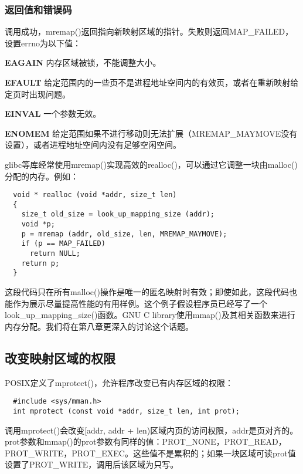 \subsubsection{返回值和错误码}

调用成功，mremap()返回指向新映射区域的指针。失败则返回MAP\_FAILED，设置errno为以下值：

\begin{eqlist*}
\item[\textbf{EAGAIN}] 内存区域被锁，不能调整大小。
\item[\textbf{EFAULT}] 给定范围内的一些页不是进程地址空间内的有效页，或者在重新映射给定页时出现问题。
\item[\textbf{EINVAL}] 一个参数无效。
\item[\textbf{ENOMEM}] 给定范围如果不进行移动则无法扩展（MREMAP\_MAYMOVE没有设置），或者进程地址空间内没有足够空闲空间。
\end{eqlist*}

glibc等库经常使用mremap()实现高效的realloc()，可以通过它调整一块由malloc()分配的内存。例如：

\begin{lstlisting}
  void * realloc (void *addr, size_t len)
  {
    size_t old_size = look_up_mapping_size (addr);
    void *p;
    p = mremap (addr, old_size, len, MREMAP_MAYMOVE);
    if (p == MAP_FAILED)
      return NULL;
    return p;
  }
\end{lstlisting}

这段代码只在所有malloc()操作是唯一的匿名映射时有效；即使如此，这段代码也能作为展示尽量提高性能的有用样例。这个例子假设程序员已经写了一个look\_up\_mapping\_size()函数。GNU C library使用mmap()及其相关函数来进行内存分配。我们将在第八章更深入的讨论这个话题。

\subsection{改变映射区域的权限}

POSIX定义了mprotect()，允许程序改变已有内存区域的权限：

\begin{lstlisting}
  #include <sys/mman.h>
  int mprotect (const void *addr, size_t len, int prot);
\end{lstlisting}

调用mprotect()会改变[addr, addr + len)区域内页的访问权限，addr是页对齐的。prot参数和mmap()的prot参数有同样的值：PROT\_NONE，PROT\_READ，PROT\_WRITE，PROT\_EXEC。这些值不是累积的；如果一块区域可读prot值设置了PROT\_WRITE，调用后该区域为只写。

